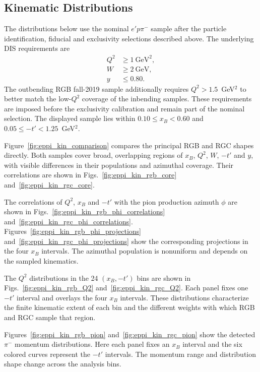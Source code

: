 \subsection{Kinematic Distributions}
\label{sec:kinematic_distributions}

The distributions below use the nominal $e'p\pi^-$ sample after the particle identification, fiducial and exclusivity selections described above. The underlying DIS requirements are
\begin{align}
 Q^2 &\geq 1~\mathrm{GeV}^2, \\
 W &\geq 2~\mathrm{GeV}, \\
 y &\leq 0.80.
 \label{eq:eppi_kinematic_requirements}
\end{align}
The outbending RGB fall-2019 sample additionally requires $Q^2>1.5$~GeV$^2$ to better match the low-$Q^2$ coverage of the inbending samples. These requirements are imposed before the exclusivity calibration and remain part of the nominal selection. The displayed sample lies within $0.10\leq x_B<0.60$ and $0.05\leq-t'<1.25$~GeV$^2$.


Figure~\ref{fig:eppi_kin_comparison} compares the principal RGB and RGC shapes directly. Both samples cover broad, overlapping regions of $x_B$, $Q^2$, $W$, $-t'$ and $y$, with visible differences in their populations and azimuthal coverage. Their correlations are shown in Figs.~\ref{fig:eppi_kin_rgb_core} and~\ref{fig:eppi_kin_rgc_core}.

The correlations of $Q^2$, $x_B$ and $-t'$ with the pion production azimuth $\phi$ are shown in Figs.~\ref{fig:eppi_kin_rgb_phi_correlations} and~\ref{fig:eppi_kin_rgc_phi_correlations}. Figures~\ref{fig:eppi_kin_rgb_phi_projections} and~\ref{fig:eppi_kin_rgc_phi_projections} show the corresponding projections in the four $x_B$ intervals. The azimuthal population is nonuniform and depends on the sampled kinematics. 

The $Q^2$ distributions in the 24 $(x_B,-t')$ bins are shown in Figs.~\ref{fig:eppi_kin_rgb_Q2} and~\ref{fig:eppi_kin_rgc_Q2}. Each panel fixes one $-t'$ interval and overlays the four $x_B$ intervals. These distributions characterize the finite kinematic extent of each bin and the different weights with which RGB and RGC sample that region.

Figures~\ref{fig:eppi_kin_rgb_pion} and~\ref{fig:eppi_kin_rgc_pion} show the detected $\pi^-$ momentum distributions. Here each panel fixes an $x_B$ interval and the six colored curves represent the $-t'$ intervals. The momentum range and distribution shape change across the analysis bins.

